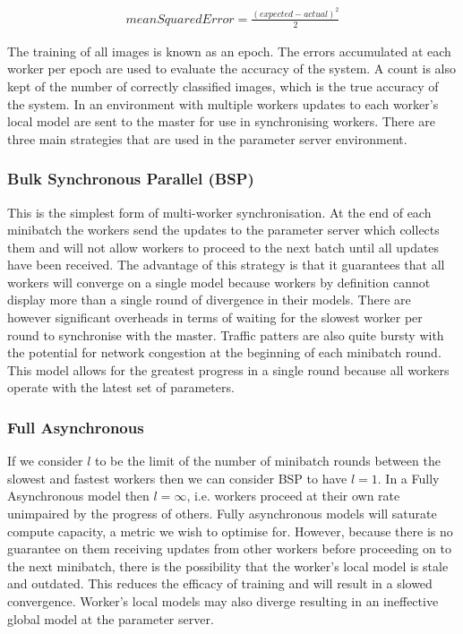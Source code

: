 \documentclass[12pt]{article}
\begin{document}
\begin{align*}
meanSquaredError = \frac{(expected - actual)^2}{2}
\end{align*}

The training of all images is known as an epoch. The errors accumulated at each worker per epoch are used to evaluate the accuracy of the system. A count is also kept of the number of correctly classified images, which is the true accuracy of the system.
\newline
\newline
In an environment with multiple workers updates to each worker's local model are sent to the master for use in synchronising workers. There are three main strategies that are used in the parameter server environment.

\subsubsection{Bulk Synchronous Parallel (BSP)}
This is the simplest form of multi-worker synchronisation. At the end of each minibatch the workers send the updates to the parameter server which collects them and will not allow workers to proceed to the next batch until all updates have been received. The advantage of this strategy is that it guarantees that all workers will converge on a single model because workers by definition cannot display more than a single round of divergence in their models. There are however significant overheads in terms of waiting for the slowest worker per round to synchronise with the master. Traffic patters are also quite bursty with the potential for network congestion at the beginning of each minibatch round. This model allows for the greatest progress in a single round because all workers operate with the latest set of parameters.

\subsubsection{Full Asynchronous}
If we consider $l$ to be the limit of the number of minibatch rounds between the slowest and fastest workers then we can consider BSP to have $l = 1$. In a Fully Asynchronous model then $l = \infty$, i.e. workers proceed at their own rate unimpaired by the progress of others. Fully asynchronous models will saturate compute capacity, a metric we wish to optimise for. However, because there is no guarantee on them receiving updates from other workers before proceeding on to the next minibatch, there is the possibility that the worker's local model is stale and outdated. This reduces the efficacy of training and will result in a slowed convergence. Worker's local models may also diverge resulting in an ineffective global model at the parameter server.
\end{document}
